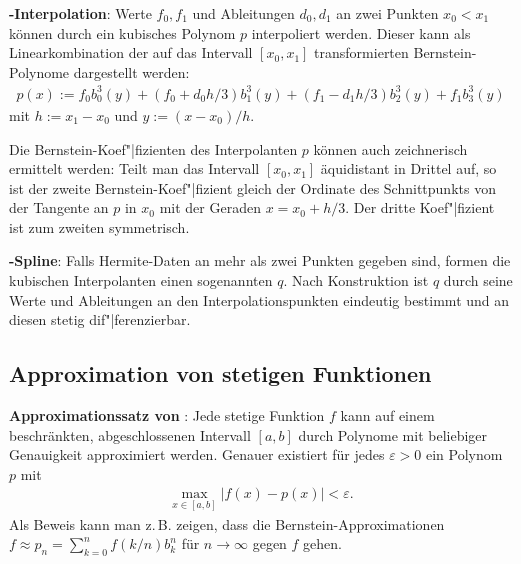 \textbf{-Interpolation}:
Werte $f_0, f_1$ und Ableitungen $d_0, d_1$ an zwei Punkten $x_0 < x_1$ können durch ein
kubisches Polynom $p$ interpoliert werden.
Dieser  kann als Linearkombination der auf das Intervall
$[x_0, x_1]$ transformierten Bernstein-Polynome dargestellt werden:
\begin{align*}
    p(x) := f_0 b_0^3(y) + (f_0 + d_0 h/3) b_1^3(y) + (f_1 - d_1 h/3) b_2^3(y) + f_1 b_3^3(y)
\end{align*}
mit $h := x_1 - x_0$ und $y := (x - x_0)/h$.

Die Bernstein-Koef"|fizienten des Interpolanten $p$ können auch zeichnerisch ermittelt werden:
Teilt man das Intervall $[x_0, x_1]$ äquidistant in Drittel auf, so ist der zweite
Bernstein-Koef"|fizient gleich der Ordinate des Schnittpunkts von der Tangente an $p$ in $x_0$
mit der Geraden $x = x_0 + h/3$.
Der dritte Koef"|fizient ist zum zweiten symmetrisch.

\linie

\textbf{-Spline}:
Falls Hermite-Daten an mehr als zwei Punkten gegeben sind, formen die kubischen Interpolanten
einen sogenannten  $q$.
Nach Konstruktion ist $q$ durch seine Werte und Ableitungen an den
Interpolationspunkten eindeutig bestimmt und an diesen stetig dif"|ferenzierbar.

\subsection{%
    Approximation von stetigen Funktionen%
}

\textbf{Approximationssatz von }:
Jede stetige Funktion $f$ kann auf einem beschränkten, abgeschlossenen Intervall $[a, b]$
durch Polynome mit beliebiger Genauigkeit approximiert werden.
Genauer existiert für jedes $\varepsilon > 0$ ein Polynom $p$ mit
\begin{align*}
    \max_{x \in [a, b]} |f(x) - p(x)| < \varepsilon.
\end{align*}
Als Beweis kann man z.\,B. zeigen,
dass die Bernstein-Approximationen\\
$f \approx p_n = \sum_{k=0}^n f(k/n) b_k^n$ für $n \to \infty$ gegen $f$ gehen.

\pagebreak
